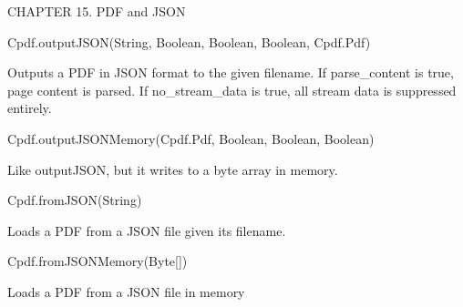 CHAPTER 15. PDF and JSON

Cpdf.outputJSON(String, Boolean, Boolean, Boolean, Cpdf.Pdf)

Outputs a PDF in JSON format to the given filename. If parse_content is true,
page content is parsed. If no_stream_data is true, all stream data is
suppressed entirely.

Cpdf.outputJSONMemory(Cpdf.Pdf, Boolean, Boolean, Boolean)

Like outputJSON, but it writes to a byte array in memory.

Cpdf.fromJSON(String)

Loads a PDF from a JSON file given its filename.

Cpdf.fromJSONMemory(Byte[])

Loads a PDF from a JSON file in memory

